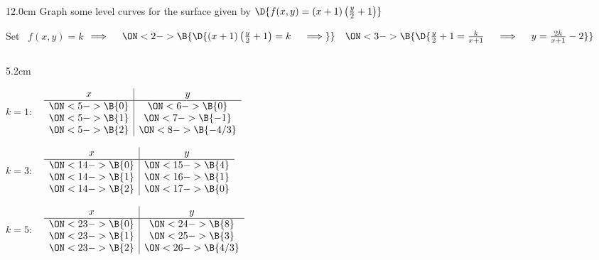 \begin{frame}
\frametitle{}
\scriptsize
\begin{columns}
\begin{column}{12.0cm}
\EX Graph some level curves for the surface given by \quad $\D{f(x,y) = (x+1)\left(\frac{y}{2}+1\right)}$

\vspace{0.5cm}

Set \, $f(x,y) = k$ \quad $\implies \quad 
\ON<2->{\B{\D{(x+1)\left(\frac{y}{2}+1\right) = k \quad \implies}}} \quad 
\ON<3->{\B{\D{\frac{y}{2}+1 = \frac{k}{x+1} \quad \implies \quad y = \frac{2k}{x+1} - 2}}}$ 

\vspace{0.5cm}

\begin{columns}
\begin{column}{5.2cm}

$k=1$: \,\,\, 
$
\begin{array}{c|c}
	x&y \\
	\hline
	\ON<5->{\B{0}}&\ON<6->{\B{0}} \\
	\ON<5->{\B{1}}&\ON<7->{\B{-1}} \\
	\ON<5->{\B{2}}&\ON<8->{\B{-4/3}} \\
\end{array}
$

\vspace{0.5cm}


$k=3$: \,\,\, 
$
\begin{array}{c|c}
	x&y \\
	\hline
	\ON<14->{\B{0}}&\ON<15->{\B{4}} \\
	\ON<14->{\B{1}}&\ON<16->{\B{1}} \\
	\ON<14->{\B{2}}&\ON<17->{\B{0}} \\
\end{array}
$

\vspace{0.5cm}

$k=5$: \,\,\, 
$
\begin{array}{c|c}
	x&y \\
	\hline
	\ON<23->{\B{0}}&\ON<24->{\B{8}} \\
	\ON<23->{\B{1}}&\ON<25->{\B{3}} \\
	\ON<23->{\B{2}}&\ON<26->{\B{4/3}} \\
\end{array}
$


\end{column}
\end{columns}
\end{column}
\end{columns}
\end{frame}
